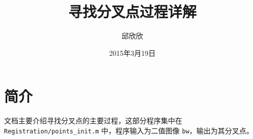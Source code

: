 \documentclass[12pt]{article}
\begin{document}
\title{\vspace{-2em}寻找分叉点过程详解\vspace{-0.7em}}

\author{邱欣欣}
\date{\vspace{-0.7em}2015年3月19日\vspace{-0.7em}}
\maketitle\thispagestyle{fancy}

\section{简介}
文档主要介绍寻找分叉点的主要过程，这部分程序集中在 \verb|Registration/points_init.m| 中，程序输入为二值图像 \verb|bw|，输出为其分叉点。
\end{document}
